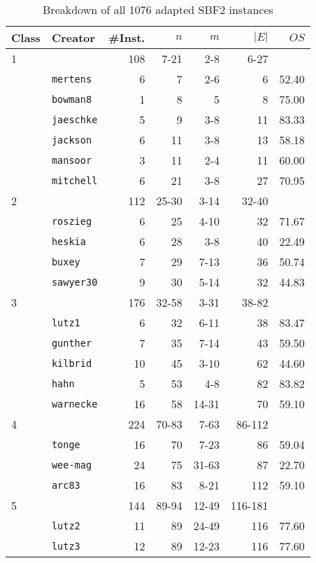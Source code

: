 \begin{table}[tpb]
	\centering
	\caption{Breakdown of all 1076 adapted SBF2 instances}
	\vspace{2mm}
	\begin{tabular}{llrrrrr}
		\toprule
		Class & Creator & \#Inst. & $n$ & $m$ & $|E|$ & $OS$ \\
		\midrule\midrule
		1 &  & 108 & 7-21 & 2-8 & 6-27 & \\
		 & {\tt mertens}  & 6 & 7 & 2-6 & 6 & 52.40\\
		  & {\tt bowman8}  & 1 & 8 & 5 & 8 & 75.00\\
		  & {\tt jaeschke} & 5 & 9 & 3-8 & 11 & 83.33\\
		  & {\tt jackson}  & 6 & 11 & 3-8 & 13 & 58.18\\
		  & {\tt mansoor}  & 3 & 11 & 2-4 & 11 & 60.00\\
		  & {\tt mitchell} & 6 & 21 & 3-8 & 27 & 70.95\\\midrule
		2 &  & 112 & 25-30 & 3-14 & 32-40 & \\
		  & {\tt roszieg} & 6 & 25 & 4-10 & 32 & 71.67\\
		  & {\tt heskia}   & 6 & 28 & 3-8 & 40 & 22.49\\
		  & {\tt buxey}    & 7 & 29 & 7-13 & 36 & 50.74\\
		  & {\tt sawyer30} & 9 & 30 & 5-14 & 32 & 44.83\\\midrule
		3 &  & 176 & 32-58 & 3-31 & 38-82 & \\
		  & {\tt lutz1}   & 6 & 32 & 6-11 & 38 & 83.47\\
		  & {\tt gunther}  & 7 & 35 & 7-14 & 43 & 59.50\\
		  & {\tt kilbrid}  & 10 & 45 & 3-10 & 62 & 44.60\\
		  & {\tt hahn}     & 5 & 53 & 4-8 & 82 & 83.82\\
		  & {\tt warnecke} & 16 & 58 & 14-31 & 70 & 59.10\\\midrule
		4 &  & 224 & 70-83 & 7-63 & 86-112 &  \\
		 & {\tt tonge} & 16 & 70 & 7-23 & 86 & 59.04 \\
		  & {\tt wee-mag} & 24 & 75 & 31-63 & 87 & 22.70 \\
		  & {\tt arc83} & 16 & 83 & 8-21 & 112 & 59.10 \\\midrule
		5 &  & 144 & 89-94 & 12-49 & 116-181 &  \\
		  & {\tt lutz2} & 11 & 89 & 24-49 & 116 & 77.60 \\
		  & {\tt lutz3} & 12 & 89 & 12-23 & 116 & 77.60 \\

\end{tabular}
\end{table}
